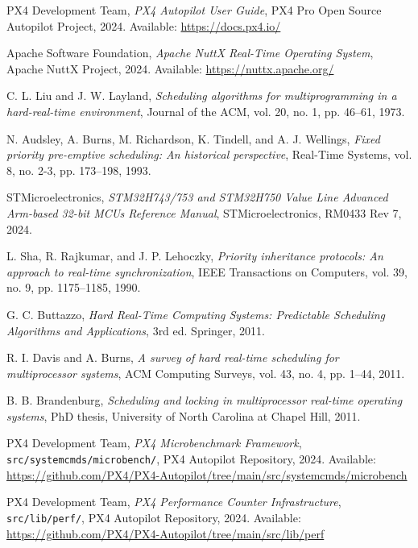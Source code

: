 \documentclass[11pt,a4paper]{article}
\theoremstyle{definition}
\theoremstyle{remark}
\begin{document}

\begin{thebibliography}{9}

PX4 Development Team,
\textit{PX4 Autopilot User Guide},
PX4 Pro Open Source Autopilot Project, 2024.
Available: \url{https://docs.px4.io/}

Apache Software Foundation,
\textit{Apache NuttX Real-Time Operating System},
Apache NuttX Project, 2024.
Available: \url{https://nuttx.apache.org/}

C. L. Liu and J. W. Layland,
\textit{Scheduling algorithms for multiprogramming in a hard-real-time environment},
Journal of the ACM, vol. 20, no. 1, pp. 46--61, 1973.

N. Audsley, A. Burns, M. Richardson, K. Tindell, and A. J. Wellings,
\textit{Fixed priority pre-emptive scheduling: An historical perspective},
Real-Time Systems, vol. 8, no. 2-3, pp. 173--198, 1993.

STMicroelectronics,
\textit{STM32H743/753 and STM32H750 Value Line Advanced Arm-based 32-bit MCUs Reference Manual},
STMicroelectronics, RM0433 Rev 7, 2024.

L. Sha, R. Rajkumar, and J. P. Lehoczky,
\textit{Priority inheritance protocols: An approach to real-time synchronization},
IEEE Transactions on Computers, vol. 39, no. 9, pp. 1175--1185, 1990.

G. C. Buttazzo,
\textit{Hard Real-Time Computing Systems: Predictable Scheduling Algorithms and Applications},
3rd ed. Springer, 2011.

R. I. Davis and A. Burns,
\textit{A survey of hard real-time scheduling for multiprocessor systems},
ACM Computing Surveys, vol. 43, no. 4, pp. 1--44, 2011.

B. B. Brandenburg,
\textit{Scheduling and locking in multiprocessor real-time operating systems},
PhD thesis, University of North Carolina at Chapel Hill, 2011.

PX4 Development Team,
\textit{PX4 Microbenchmark Framework},
\texttt{src/systemcmds/microbench/}, PX4 Autopilot Repository, 2024.
Available: \url{https://github.com/PX4/PX4-Autopilot/tree/main/src/systemcmds/microbench}

PX4 Development Team,
\textit{PX4 Performance Counter Infrastructure},
\texttt{src/lib/perf/}, PX4 Autopilot Repository, 2024.
Available: \url{https://github.com/PX4/PX4-Autopilot/tree/main/src/lib/perf}


\end{thebibliography}
\end{document}
